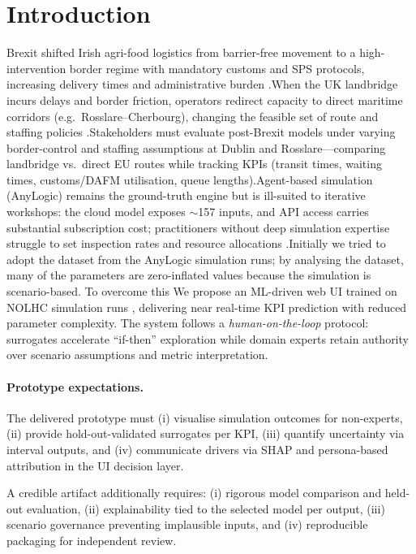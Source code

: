 \documentclass[12pt,twocolumn,a4paper]{article}
\theoremstyle{plain}
\theoremstyle{definition}
\theoremstyle{remark}
\begin{document}
\section{Introduction}
Brexit shifted Irish agri-food logistics from barrier-free movement to a high-intervention border regime with mandatory customs and SPS protocols, increasing delivery times and administrative burden \cite{mahfouz2019,mahfouz2020}.When the UK landbridge incurs delays and border friction, operators redirect capacity to direct maritime corridors (e.g.\ Rosslare--Cherbourg), changing the feasible set of route and staffing policies \cite{copenhagen2018,ivanov2025}.Stakeholders must evaluate post-Brexit models under varying border-control and staffing assumptions at Dublin and Rosslare---comparing landbridge vs.\ direct EU routes while tracking KPIs (transit times, waiting times, customs/DAFM utilisation, queue lengths).Agent-based simulation (AnyLogic) remains the ground-truth engine but is ill-suited to iterative workshops: the cloud model exposes ${\sim}$157 inputs, and API access carries substantial subscription cost; practitioners without deep simulation expertise struggle to set inspection rates and resource allocations \cite{byrne2009,amroune2019}.Initially we tried to adopt the dataset from the AnyLogic simulation runs; by analysing the dataset, many of the parameters are zero-inflated values because the simulation is scenario-based. To overcome this We propose an ML-driven web UI trained on NOLHC simulation runs \cite{cioppa2007,viana2016,bogoclu2021}, delivering near real-time KPI prediction with reduced parameter complexity.
The system follows a \emph{human-on-the-loop} protocol: surrogates accelerate ``if-then'' exploration while domain experts retain authority over scenario assumptions and metric interpretation.

\paragraph{Prototype expectations.}
The delivered prototype must (i) visualise simulation outcomes for non-experts, (ii) provide hold-out-validated surrogates per KPI, (iii) quantify uncertainty via interval outputs, and (iv) communicate drivers via SHAP and persona-based attribution in the UI decision layer.

A credible artifact additionally requires:
(i) rigorous model comparison and held-out evaluation,
(ii) explainability tied to the selected model per output,
(iii) scenario governance preventing implausible inputs, and
(iv) reproducible packaging for independent review.
\end{document}
